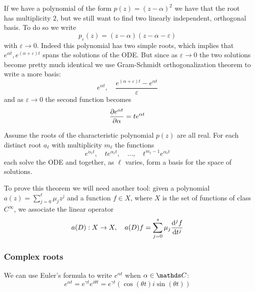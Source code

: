\documentclass[12pt]{extarticle}
\begin{document}
If we have a polynomial of the form $p(z) = (z - \alpha)^2$ we have that the root has multiplicity $2$, but we still want to find two linearly independent, orthogonal basis.
To do so we write
\begin{equation}
	p_\varepsilon(z) = (z-\alpha)(z-\alpha - \varepsilon)
\end{equation}
with $\varepsilon \to 0$.
Indeed this polynomial has two simple roots, which implies that $e^{\alpha t}, e^{(\alpha + \varepsilon) t}$ spans the solutions of the ODE.
But since as $\varepsilon \to 0$ the two solutions become pretty much identical we use Gram-Schmidt orthogonalization
theorem to write a more  basis:
\begin{equation}
	e^{\alpha t}, \quad \frac{e^{(\alpha + \varepsilon)t} - e^{\alpha t}}{\varepsilon}
\end{equation}
and as $\varepsilon \to 0$ the second function becomes
\begin{equation}
	\pdv{e^{\alpha t}}{\alpha} = t e ^{\alpha t}
\end{equation}

\begin{theorem}{}{}
	Assume the roots of the characteristic polynomial $p(z)$ are all real.
	For each distinct root $a_\ell$ with multiplicity $m_\ell$ the functions
	\begin{equation}
		e^{\alpha_\ell t}, \quad t e^{\alpha_\ell t}, \quad \ldots, \quad t^{m_\ell -1} e^{\alpha_\ell t}
	\end{equation}
	each solve the ODE and together, as $\ell$ varies, form a basis for the space of solutions.
\end{theorem}

To prove this theorem we will need another tool:
given a polynomial $a(z) = \sum^\ell_{j = 0} \mu_j z^j$ and a function $f \in X$, where $X$ is the set of functions of class $C^\infty$, we associate the linear operator
\begin{equation}
	a(D): X \to X, \quad a(D) f = \sum_{j = 0}^{s} \mu_j \dv[j]{f}{t}
\end{equation}

\subsubsection{Complex roots}

We can use Euler's formula to write $e^{\alpha t}$ when $\alpha \in \C$:
\begin{equation}
	e^{\alpha t} = e^{\gamma t}e^{i \theta t} = e^{\gamma t}(\cos(\theta t) i \sin (\theta t))
\end{equation}
\end{document}
